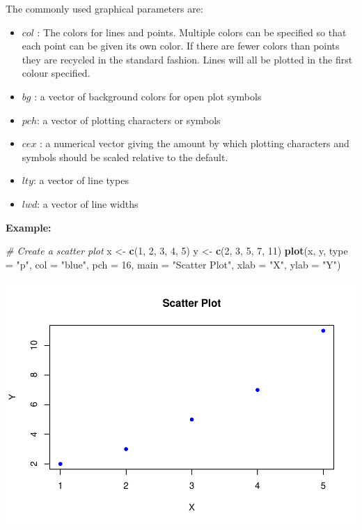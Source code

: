 \documentclass[
]{book}
\newenvironment{Shaded}{\begin{snugshade}}{\end{snugshade}}
\newcommand{\AttributeTok}[1]{\textcolor[rgb]{0.13,0.29,0.53}{#1}}
\newcommand{\CommentTok}[1]{\textcolor[rgb]{0.56,0.35,0.01}{\textit{#1}}}
\newcommand{\DecValTok}[1]{\textcolor[rgb]{0.00,0.00,0.81}{#1}}
\newcommand{\FunctionTok}[1]{\textcolor[rgb]{0.13,0.29,0.53}{\textbf{#1}}}
\newcommand{\NormalTok}[1]{#1}
\newcommand{\OtherTok}[1]{\textcolor[rgb]{0.56,0.35,0.01}{#1}}
\newcommand{\StringTok}[1]{\textcolor[rgb]{0.31,0.60,0.02}{#1}}
\begin{document}
The commonly used graphical parameters are:

\begin{itemize}
\item
  \(col\) : The colors for lines and points. Multiple colors can be specified so that each point can be given its own color. If there are fewer colors than points they are recycled in the standard fashion. Lines will all be plotted in the first colour specified.
\item
  \(bg\) : a vector of background colors for open plot symbols
\item
  \(pch\): a vector of plotting characters or symbols
\item
  \(cex\) : a numerical vector giving the amount by which plotting characters and symbols should be scaled relative to the default.
\item
  \(lty\): a vector of line types
\item
  \(lwd\): a vector of line widths
\end{itemize}

\textbf{Example:}

\begin{Shaded}
\begin{Highlighting}[]
\CommentTok{\# Create a scatter plot}
\NormalTok{x }\OtherTok{\textless{}{-}} \FunctionTok{c}\NormalTok{(}\DecValTok{1}\NormalTok{, }\DecValTok{2}\NormalTok{, }\DecValTok{3}\NormalTok{, }\DecValTok{4}\NormalTok{, }\DecValTok{5}\NormalTok{)}
\NormalTok{y }\OtherTok{\textless{}{-}} \FunctionTok{c}\NormalTok{(}\DecValTok{2}\NormalTok{, }\DecValTok{3}\NormalTok{, }\DecValTok{5}\NormalTok{, }\DecValTok{7}\NormalTok{, }\DecValTok{11}\NormalTok{)}
\FunctionTok{plot}\NormalTok{(x, y, }\AttributeTok{type =} \StringTok{"p"}\NormalTok{, }\AttributeTok{col =} \StringTok{"blue"}\NormalTok{, }\AttributeTok{pch =} \DecValTok{16}\NormalTok{, }\AttributeTok{main =} \StringTok{"Scatter Plot"}\NormalTok{, }\AttributeTok{xlab =} \StringTok{"X"}\NormalTok{, }\AttributeTok{ylab =} \StringTok{"Y"}\NormalTok{)}
\end{Highlighting}
\end{Shaded}

\includegraphics{_main_files/figure-latex/unnamed-chunk-25-1.pdf}
\end{document}
